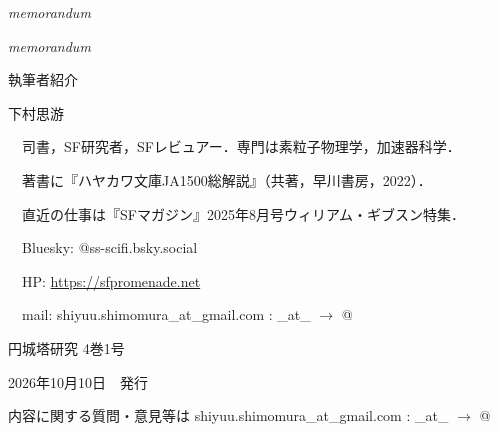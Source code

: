 \documentclass[10pt, a5paper, twoside]{ltjsarticle}
\theoremstyle{definition}
\begin{document}
	\begin{center}

		\Large{\textit{memorandum}}

	\end{center}

	\newpage

	\begin{center}

		\Large{\textit{memorandum}}

	\end{center}

	\newpage

	{\large 執筆者紹介}

	\vspace{3mm}

	下村思游

	　司書，SF研究者，SFレビュアー．専門は素粒子物理学，加速器科学．

	　著書に『ハヤカワ文庫JA1500総解説』（共著，早川書房，2022）．

	　直近の仕事は『SFマガジン』2025年8月号ウィリアム・ギブスン特集．

	　Bluesky: @ss-scifi.bsky.social

	　HP: \url{https://sfpromenade.net}

	　mail: shiyuu.shimomura\_at\_gmail.com : \_at\_ $\rightarrow$ @

	\vfill

	\flushleft{}
	\hrulefill

	\begin{center}
		{\Large 円城塔研究 4巻1号}

		2026年10月10日　発行
	\end{center}


	\hrulefill

	内容に関する質問・意見等は shiyuu.shimomura\_at\_gmail.com : \_at\_ $\rightarrow$ @
\end{document}
